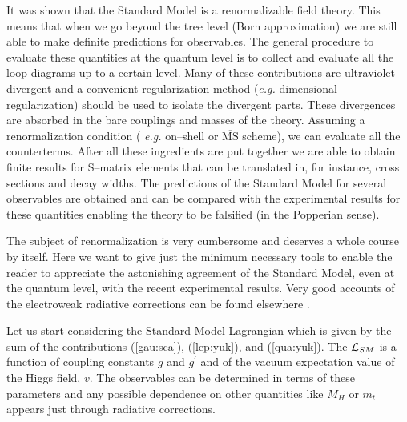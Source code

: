 \documentclass[12pt]{report}
\newcommand{\linha}{\enlargethispage{1\baselineskip}}
\newcommand{\lag}{{\cal L}}
\begin{document}
It was shown that the Standard Model is a renormalizable field
theory.  This means that when we go beyond the tree level (Born
approximation) we are still able to make definite predictions for
observables. The general procedure to evaluate these quantities at
the quantum level is to collect and evaluate all the loop diagrams up
to a certain level. Many of these contributions are ultraviolet
divergent and a convenient regularization method ({\it e.g.}
dimensional regularization) should be used to isolate the divergent
parts. These divergences are absorbed in the bare couplings and
masses of the theory. Assuming a  renormalization condition ({\it
e.g.} on--shell or $\overline{\mbox{MS}}$ scheme), we can evaluate
all the counterterms. After all these ingredients are put together we
are able to obtain finite results for S--matrix elements that can be
translated in, for instance, cross sections and decay widths. The
predictions of the Standard Model for several observables are
obtained and can be compared with the experimental results for these
quantities enabling the theory to be falsified (in the Popperian
sense).

The subject of renormalization is very cumbersome  and deserves a
whole course by itself. Here we want to give just the minimum
necessary tools to enable the reader to appreciate the astonishing
agreement of the Standard Model, even at the quantum level, with the
recent experimental results. Very good accounts of the electroweak
radiative corrections can be found elsewhere
\cite{Hollik:94,Barbieri:95,Sirlin:99}.

Let us start considering the Standard Model Lagrangian which is given
by the sum of the contributions (\ref{gau:sca}), (\ref{lep:yuk}), and
(\ref{qua:yuk}). The $\lag_{SM}$ is a function of coupling constants
$g$ and $g^\prime$ and of the vacuum expectation value of the Higgs
field, $v$. The observables can be determined in terms of these
parameters and any possible dependence on other quantities like
$M_H$ or $m_t$ appears just through radiative corrections.

\linha
\end{document}
